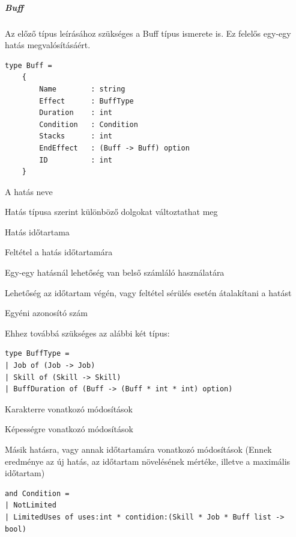 \documentclass[12pt]{article}
\begin{document}
\subparagraph{Buff}

Az előző típus leírásához szükséges a Buff típus ismerete is. Ez felelős egy-egy hatás megvalósításáért.

\begin{lstlisting}
type Buff =
	{
		Name        : string
		Effect      : BuffType
		Duration    : int
		Condition   : Condition
		Stacks      : int
		EndEffect   : (Buff -> Buff) option
		ID          : int
	}
\end{lstlisting}

\begin{description}[align=left,labelwidth=2.5cm]
	\item [Name] A hatás neve
	\item [Effect] Hatás típusa szerint különböző dolgokat változtathat meg
	\item [Duration] Hatás időtartama
	\item [Condition] Feltétel a hatás időtartamára
	\item [Stacks] Egy-egy hatásnál lehetőség van belső számláló használatára
	\item [EndEffect] Lehetőség az időtartam végén, vagy feltétel sérülés esetén átalakítani a hatást
	\item [ID] Egyéni azonosító szám
\end{description}

Ehhez továbbá szükséges az alábbi két típus:

\begin{lstlisting}
type BuffType =
| Job of (Job -> Job)
| Skill of (Skill -> Skill)
| BuffDuration of (Buff -> (Buff * int * int) option)
\end{lstlisting}

\begin{description}[align=left,labelwidth=2.5cm]
	\item [Job] Karakterre vonatkozó módosítások
	\item [Skill] Képességre vonatkozó módosítások
	\item [BuffDuration] Másik hatásra, vagy annak időtartamára vonatkozó módosítások (Ennek eredménye az új hatás, az időtartam növelésének mértéke, illetve a maximális időtartam)
\end{description}

\begin{lstlisting}
and Condition =
| NotLimited
| LimitedUses of uses:int * contidion:(Skill * Job * Buff list -> bool)
\end{lstlisting}
\end{document}
